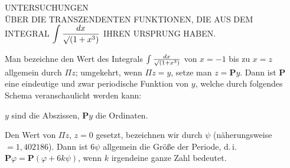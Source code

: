 \clearpage
{}%

\begin{center}
\large UNTERSUCHUNGEN\\
ÜBER DIE TRANSZENDENTEN FUNKTIONEN, DIE AUS DEM\\
INTEGRAL $\displaystyle\int \frac{dx}{\mathord{\surd}(1+x^3)}$ IHREN URSPRUNG HABEN.
\end{center}



\noindent\hspace*{\parindent}Man bezeichne den Wert des Integrals $\int \frac{dx}{\mathord{\surd}(1+x^3)}$ von $x=-1$ bis zu
$x=z$ allgemein durch $\Pi z$; umgekehrt, wenn $\Pi z=y$, setze man $z=\boldsymbol{P}y$.
Dann ist $\boldsymbol{P}$ eine eindeutige und zwar periodische Funktion von $y$, welche
durch folgendes Schema veranschaulicht werden kann:

\begin{center}\end{center}

\noindent $y$ sind die Abszissen, $\boldsymbol{P}y$ die Ordinaten.

Den Wert von $\Pi z$, $z=0$ gesetzt, bezeichnen wir durch $\psi$ (näherungsweise
$=1{,}402186$). Dann ist $6\psi$ allgemein die Größe der Periode, d.\,i.
$\boldsymbol{P}\varphi=\boldsymbol{P}(\varphi+6k\psi)$, wenn $k$ irgendeine ganze Zahl
bedeutet.
